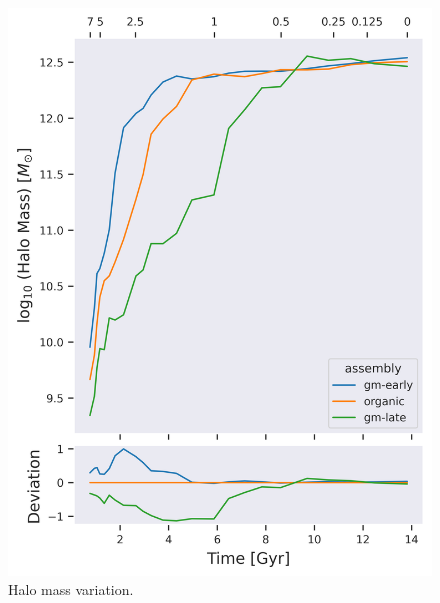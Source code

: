 \documentclass[twocolumn]{article}
\begin{document}
	\begin{figure}
			\centering 
			\includegraphics[width=\columnwidth]{./Halo_mass.png}
			\caption{Halo mass variation.}
	\end{figure}
	
\end{document}
